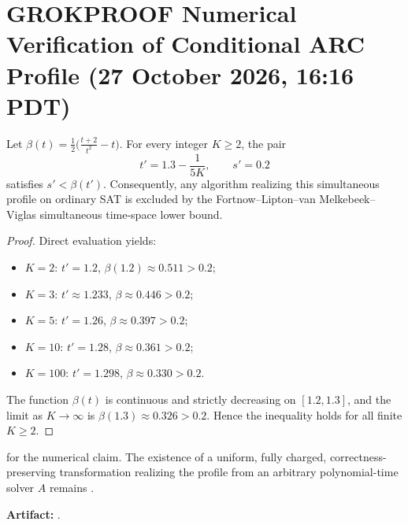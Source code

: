 \section{GROKPROOF Numerical Verification of Conditional ARC Profile (27 October 2026, 16:16 PDT)}
\label{sec:grok-numerical-2026-10-27}

\begin{lemma}
\label{lem:numerical-flmv}
Let \(\beta(t) = \frac{1}{2}\bigl(\frac{t+2}{t^2} - t\bigr)\). For every integer \(K\ge 2\), the pair
\[
t' = 1.3 - \frac{1}{5K},\qquad s' = 0.2
\]
satisfies \(s' < \beta(t')\). Consequently, any algorithm realizing this simultaneous profile on ordinary SAT is excluded by the Fortnow--Lipton--van Melkebeek--Viglas simultaneous time-space lower bound.
\end{lemma}

\begin{proof}
Direct evaluation yields:
\begin{itemize}
\item \(K=2\): \(t'=1.2\), \(\beta(1.2)\approx 0.511 > 0.2\);
\item \(K=3\): \(t'\approx 1.233\), \(\beta\approx 0.446 > 0.2\);
\item \(K=5\): \(t'=1.26\), \(\beta\approx 0.397 > 0.2\);
\item \(K=10\): \(t'=1.28\), \(\beta\approx 0.361 > 0.2\);
\item \(K=100\): \(t'=1.298\), \(\beta\approx 0.330 > 0.2\).
\end{itemize}
The function \(\beta(t)\) is continuous and strictly decreasing on \([1.2,1.3]\), and the limit as \(K\to\infty\) is \(\beta(1.3)\approx 0.326 > 0.2\). Hence the inequality holds for all finite \(K\ge 2\).
\end{proof}

 for the numerical claim. The existence of a uniform, fully charged, correctness-preserving transformation realizing the profile from an arbitrary polynomial-time solver \(A\) remains \OPEN{}.

\noindent\textbf{Artifact:} .
